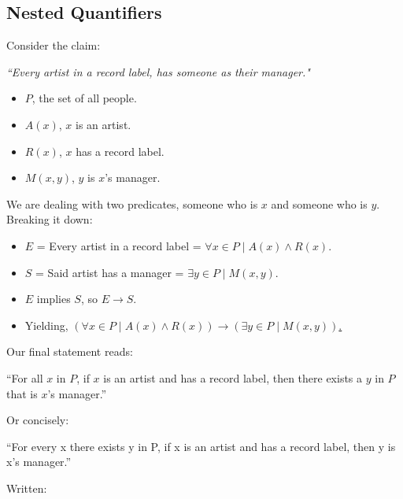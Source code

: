 \subsection{Nested Quantifiers}

\noindent
Consider the claim:

\begin{center}
    \Large
    \textit{``Every artist in a record label, has someone as their manager."}
\end{center}

\begin{itemize}
    \item $P$, the set of all people.
    \item $A(x)$, $x$ is an artist.
    \item $R(x)$, $x$ has a record label.
    \item $M(x, y)$, $y$ is $x$'s manager.
\end{itemize}

\noindent
We are dealing with two predicates, someone who is $x$ and someone who is $y$. Breaking it down:
\begin{itemize}
    \item $E$ = Every artist in a record label = $\forall x \in P \mid A(x) \land R(x)$.
    \item $S$ = Said artist has a manager =  $\exists y \in P \mid M(x, y)$.
    \item $E$ implies $S$, so $E \rightarrow S$.
    \item Yielding, \underline{$(\forall x \in P \mid A(x) \land R(x)) \rightarrow (\exists y \in P \mid M(x, y))$.}
\end{itemize}

\noindent
Our final statement reads:

\begin{center}
    \Large
    ``For all $x$ in $P$, if $x$ is an artist and has a record label, then there exists a $y$ in $P$ that is $x$'s manager.''
\end{center}

\noindent
Or concisely:\\

\begin{center}
    \Large
    ``For every x there exists y in P, if x is an artist and has a record label, then y is x's manager.''
\end{center}

\noindent
Written:\\

